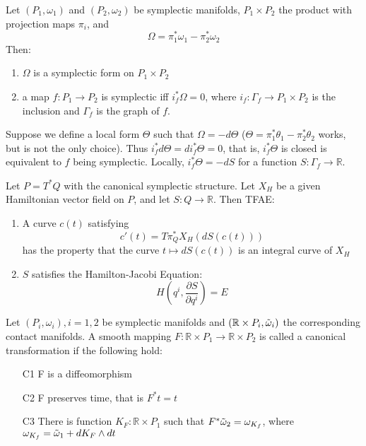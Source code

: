 \begin{prop}

Let $(P_1, \omega_1)$ and $(P_2, \omega_2)$ be symplectic manifolds, $P_1 \times P_2$ the product with projection maps $\pi_i$, and 
\[\Omega = \pi_1^* \omega_1 - \pi_2^* \omega_2\]
Then:
\begin{enumerate}
    \item $\Omega$ is a symplectic form on $P_1 \times P_2$
    \item a map $f: P_1 \to P_2$ is symplectic iff $i_f^* \Omega = 0$, where $i_f: \Gamma_f \to P_1 \times P_2$ is the inclusion and $\Gamma_f$ is the graph of $f$.
\end{enumerate}
\end{prop}

\begin{defn}
Suppose we define a local form $\Theta$ such that $\Omega = - d \Theta$ ($\Theta = \pi_1^* \theta_1 - \pi_2^*\theta_2$ works, but is not the only choice). Thus $i_f^* d\Theta = d i_f^* \Theta = 0$, that is, $i_f^*\Theta$ is closed is equivalent to $f$ being symplectic. Locally, $i_f^*\Theta = - dS$ for a function $S: \Gamma_f \to \mathbb{R}$.
\end{defn}

\begin{thm}

Let $P=T^*Q$ with the canonical symplectic structure. Let $X_H$ be a given Hamiltonian vector field on $P$, and let $S: Q \to \mathbb{R}$. Then TFAE:
\begin{enumerate}
    \item A curve $c(t)$ satisfying
    \[c'(t) = T \pi_Q^* X_H \left( dS(c(t)) \right)\]
    has the property that the curve $t \mapsto dS(c(t))$ is an integral curve of $X_H$
    \item $S$ satisfies the Hamilton-Jacobi Equation:
    \[H \left( q^i, \frac{\partial S}{\partial q^i} \right) = E    \]
\end{enumerate}
\end{thm}

\begin{defn}

Let $(P_i, \omega_i), i=1,2$ be symplectic manifolds and $(\mathbb{R} \times P_i, \Tilde{\omega}_i)$ the corresponding contact manifolds. A smooth mapping $F: \mathbb{R} \times P_1 \to \mathbb{R}\times P_2$ is called a canonical transformation if the following hold:

\begin{enumerate}
    \item[C1] F is a diffeomorphism
    \item[C2] F preserves time, that is $F^*t=t$
    \item[C3] There is function $K_F: \mathbb{R} \times P_1$ such that $F^* \Tilde{\omega}_2 = \omega_{K_f}$, where $\omega_{K_f} = \Tilde{\omega}_1 + dK_F \wedge dt$
\end{enumerate}
\end{defn}

